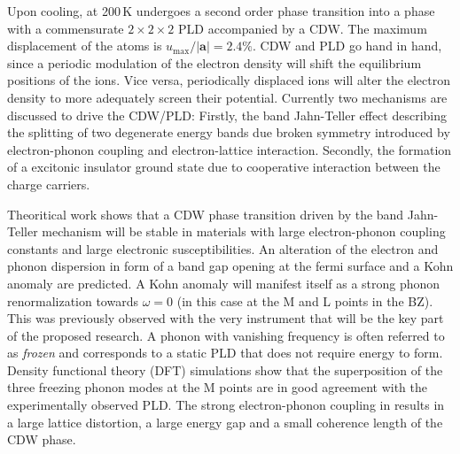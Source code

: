 Upon cooling, at 200\,K \cite{disalvo1976} \ts\space undergoes a second order phase transition into a phase with a commensurate $2\times2\times2$ \ac{PLD} accompanied by a \ac{CDW}\cite{rossnagel2011}.
The maximum displacement of the atoms is $u_\mathrm{max}/|\mathbf{a}|=2.4\%$\cite{disalvo1976}.
\ac{CDW} and \ac{PLD} go hand in hand, since a periodic modulation of the electron density will shift the equilibrium positions of the ions.
Vice versa, periodically displaced ions will alter the electron density to more adequately screen their potential.
Currently two mechanisms are discussed to drive the \ac{CDW}/\ac{PLD}: 
Firstly, the band Jahn-Teller effect describing the splitting of two degenerate energy bands due broken symmetry introduced by electron-phonon coupling and electron-lattice interaction\cite{JT}.
Secondly, the formation of a excitonic insulator ground state due to cooperative interaction between the charge carriers\cite{EI}.

Theoritical work shows that a \ac{CDW} phase transition driven by the band Jahn-Teller mechanism will be stable in materials with large electron-phonon coupling constants and large electronic susceptibilities\cite{friend1979}.
An alteration of the electron and phonon dispersion in form of a band gap opening at the fermi surface and a Kohn anomaly are predicted.
A Kohn anomaly will manifest itself as a strong phonon renormalization towards $\omega=0$\cite{kohn1959} (in this case at the M and L points in the \ac{BZ}).
This was previously observed with the very instrument that will be the key part of the proposed research\cite{otto2021}.
A phonon with vanishing frequency is often referred to as \emph{frozen} and corresponds to a static \ac{PLD} that does not require energy to form.
Density functional theory (DFT) simulations show that the superposition of the three freezing phonon modes at the M points are in good agreement with the experimentally observed \ac{PLD}\cite{kaneko2018}. %
The strong electron-phonon coupling in \ts\space results in a large lattice distortion, a large energy gap and a small coherence length of the \ac{CDW} phase\cite{haas1978,hildebrand2016}.


